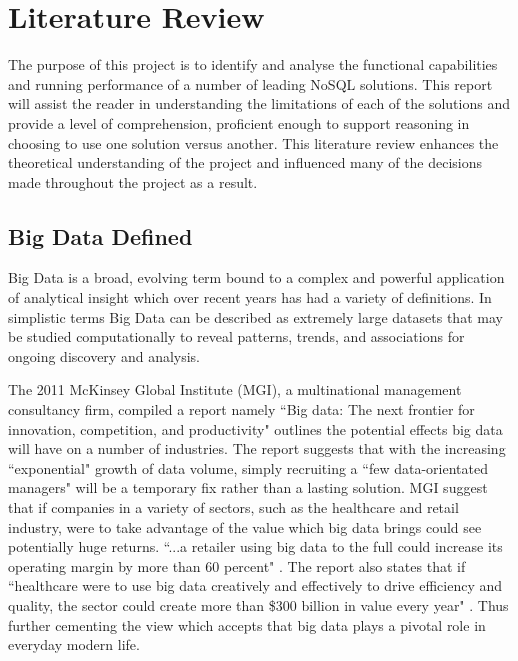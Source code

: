 \chapter{Literature Review}
The purpose of this project is to identify and analyse the functional capabilities and running performance of a number of leading NoSQL solutions. This report will assist the reader in understanding the limitations of each of the solutions and provide a level of comprehension, proficient enough to support reasoning in choosing to use one solution versus another. This literature review enhances the theoretical understanding of the project and influenced many of the decisions made throughout the project as a result.
\section{Big Data Defined}\label{bigdata}
Big Data is a broad, evolving term bound to a complex and powerful application of analytical insight which over recent years has had a variety of definitions. In simplistic terms Big Data can be described as extremely large datasets that may be studied computationally to reveal patterns, trends, and associations for ongoing discovery and analysis.

The 2011 McKinsey Global Institute (MGI), a multinational management consultancy firm, compiled a report namely ``Big data: The next frontier for innovation, competition, and productivity" outlines the potential effects big data will have on a number of industries. The report suggests that with the increasing ``exponential" growth of data volume, simply recruiting a ``few data-orientated managers" will be a temporary fix rather than a lasting solution. MGI suggest that if companies in a variety of sectors, such as the healthcare and retail industry, were to take advantage of the value which big data brings could see potentially huge returns. ``...a retailer using big data to the full could increase its operating margin by more than 60 percent" \cite{mckinskey}. The report also states that if ``healthcare were to use big data creatively and effectively to drive efficiency and quality, the sector could create more than \$300 billion in value every year" \cite{mckinskey}. Thus further cementing the view which accepts that big data plays a pivotal role in everyday modern life.

